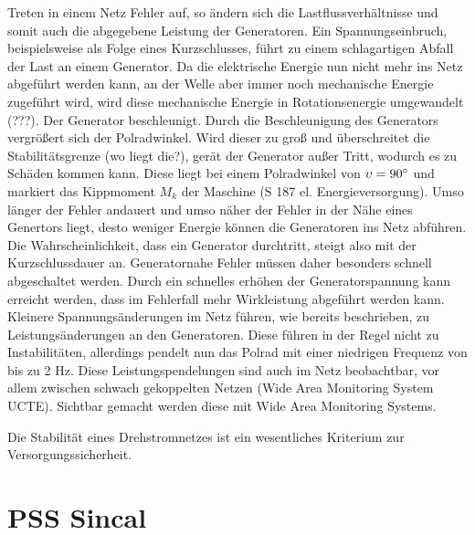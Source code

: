 \documentclass{scrartcl}
\begin{document}
\begin{onehalfspace}
Treten in einem Netz Fehler auf, so ändern sich die Lastflussverhältnisse und somit auch die abgegebene Leistung der Generatoren. Ein Spannungseinbruch, beispielsweise als Folge eines Kurzschlusses, führt zu einem schlagartigen Abfall der Last an einem Generator. Da die elektrische Energie nun nicht mehr ins Netz abgeführt werden kann, an der Welle aber immer noch mechanische Energie zugeführt wird, wird diese mechanische Energie in Rotationsenergie umgewandelt (???). Der Generator beschleunigt. Durch die Beschleunigung des Generators vergrößert sich der Polradwinkel. Wird dieser zu groß und überschreitet die Stabilitätsgrenze (wo liegt die?), gerät der Generator \glqq außer Tritt\grqq, wodurch es zu Schäden kommen kann. Diese liegt bei einem Polradwinkel von $\upsilon = 90\degree$ und markiert das Kippmoment $M_k$ der Maschine (S 187 el. Energieversorgung). Umso länger der Fehler andauert und umso näher der Fehler in der Nähe eines Genertors liegt, desto weniger Energie können die Generatoren ins Netz abführen. Die Wahrscheinlichkeit, dass ein Generator \glqq durchtritt\grqq, steigt also mit der Kurzschlussdauer an. Generatornahe Fehler müssen daher besonders schnell abgeschaltet werden. Durch ein schnelles erhöhen der Generatorspannung kann erreicht werden, dass im Fehlerfall mehr Wirkleistung abgeführt werden kann. Kleinere Spannungsänderungen im Netz führen, wie bereits beschrieben, zu Leistungsänderungen an den Generatoren. Diese führen in der Regel nicht zu Instabilitäten, allerdings pendelt nun das Polrad mit einer niedrigen Frequenz von bis zu 2 Hz. Diese Leistungspendelungen sind auch im Netz beobachtbar, vor allem zwischen schwach gekoppelten Netzen (Wide Area Monitoring System UCTE). Sichtbar gemacht werden diese mit Wide Area Monitoring Systems.

Die Stabilität eines Drehstromnetzes ist ein wesentliches Kriterium zur Versorgungssicherheit.



\section{PSS Sincal}


\end{onehalfspace}
\end{document}
